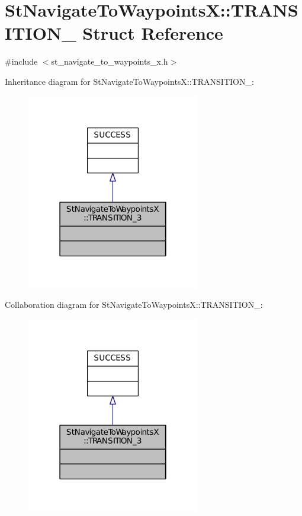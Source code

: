 \hypertarget{structStNavigateToWaypointsX_1_1TRANSITION__3}{}\section{St\+Navigate\+To\+WaypointsX\+:\+:T\+R\+A\+N\+S\+I\+T\+I\+O\+N\+\_ Struct Reference}
\label{structStNavigateToWaypointsX_1_1TRANSITION__3}


{\ttfamily \#include $<$st\+\_\+navigate\+\_\+to\+\_\+waypoints\+\_\+x.\+h$>$}



Inheritance diagram for St\+Navigate\+To\+WaypointsX\+:\+:T\+R\+A\+N\+S\+I\+T\+I\+O\+N\+\_\+:
\nopagebreak
\begin{figure}[H]
\begin{center}
\leavevmode
\includegraphics[width=214pt]{structStNavigateToWaypointsX_1_1TRANSITION__3__inherit__graph}
\end{center}
\end{figure}


Collaboration diagram for St\+Navigate\+To\+WaypointsX\+:\+:T\+R\+A\+N\+S\+I\+T\+I\+O\+N\+\_\+:
\nopagebreak
\begin{figure}[H]
\begin{center}
\leavevmode
\includegraphics[width=214pt]{structStNavigateToWaypointsX_1_1TRANSITION__3__coll__graph}
\end{center}
\end{figure}


